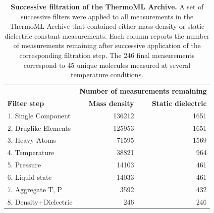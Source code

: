 \documentclass[aip, jcp, reprint]{revtex4-1}  %
\begin{document}

\begin{table}
\begin{tabular}{lrr}
\hline
 &  \multicolumn{2}{c}{\bf Number of measurements remaining} \\ \cline{2-3}
{\bf Filter step} &  {\bf Mass density} &  {\bf Static dielectric} \\ 
\hline
1.  Single Component   &               136212 &                                     1651 \\
2.  Druglike Elements  &               125953 &                                     1651 \\
3.  Heavy Atoms        &                71595 &                                     1569 \\
4.  Temperature        &                38821 &                                      964 \\
5.  Pressure           &                14103 &                                      461 \\
6.  Liquid state       &                14033 &                                      461 \\
7.  Aggregate T, P     &                 3592 &                                      432 \\
8.  Density+Dielectric &                  246 &                                      246 \\

\hline
\end{tabular}
\caption{{\bf Successive filtration of the ThermoML Archive.}
A set of successive filters were applied to all measurements in the ThermoML Archive that contained either mass density or static dielectric constant measurements.
Each column reports the number of measurements remaining after successive application of the corresponding filtration step.  
The 246 final measurements correspond to 45 unique molecules measured at several temperature conditions.  
}
\label{table:ThermoMLSummary}
\end{table}
\end{document}
